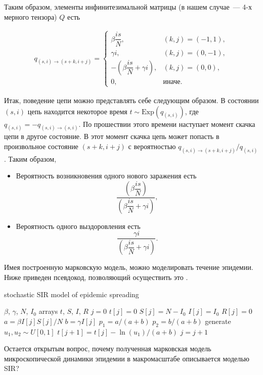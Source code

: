 \documentclass[12pt]{article}
\begin{document}
Таким образом, элементы инфинитезимальной матрицы (в нашем случае~--- 4-х мерного тензора) $Q$ есть

\begin{align*}
    q_{(s, i) \to (s+k, i+j)} = 
    \begin{cases}
        \beta \dfrac{is}{N}, & (k, j) = (-1, 1), \\
        \gamma i, & (k, j) = (0, -1), \\
        - \left(\beta \dfrac{is}{N} + \gamma i \right), & (k, j) = (0, 0), \\
        0, & \text{иначе}.
    \end{cases}
\end{align*}

Итак, поведение цепи можно представлять себе следующим образом. В состоянии $(s, i)$ цепь находится некоторое время $t \sim \mathrm{Exp}(q_{(s, i)})$, где $q_{(s, i)} = - q_{(s, i) \to (s, i)}$. По прошествии этого времени наступает момент скачка цепи в другое состояние. В этот момент скачка цепь может попасть в произвольное состояние $(s+k, i+j)$ с вероятностью $q_{(s, i) \to (s+k, i+j)} / q_{(s, i)}$. Таким образом,
\begin{itemize}
    \item Вероятность возникновения одного нового заражения есть
    \[ \dfrac{\left(\beta \dfrac{is}{N} \right)}{\left( \beta \dfrac{is}{N} + \gamma i \right)}, \]
    \item Вероятность одного выздоровления есть
    \[ \dfrac{\gamma i}{\left( \beta \dfrac{is}{N} + \gamma i \right)}. \]
\end{itemize}

Имея построенную марковскую модель, можно моделировать течение эпидемии. Ниже приведен псевдокод, позволяющий осуществить это \cite{ige2020}.

\begin{algorithm}
\caption{stochastic SIR model of epidemic spreading}\label{alg:sir}
\begin{algorithmic}
\Require $\beta$, $\gamma$, $N$, $I_0$
\Ensure arrays $t$, $S$, $I$, $R$
\State $j = 0$
\State $t[j] = 0$
\State $S[j] = N - I_0$
\State $I[j] = I_0$
\State $R[j] = 0$
    \State $a = \beta I[j] S[j] / N$
    \State $b = \gamma I[j]$
    \State $p_1 = a / (a + b)$  
    \State $p_2 = b / (a + b)$ 
    \State generate $u_1, u_2 \sim U[0, 1]$
    \State $t[j+1] = t[j] - \ln(u_1) / (a + b)$ 
     
    \EndIf
    \State $j = j + 1$
\EndWhile
\end{algorithmic}
\end{algorithm}

Остается открытым вопрос, почему полученная марковская модель микроскопической динамики эпидемии в макромасштабе описывается моделью SIR? 

\newpage




\end{document}
